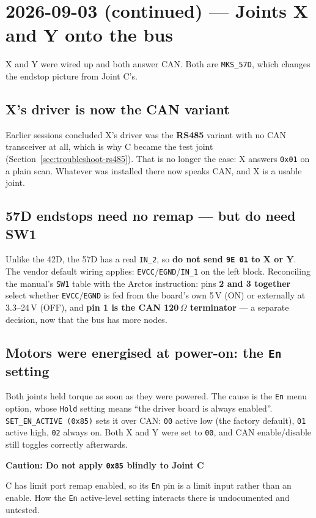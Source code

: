 \documentclass[11pt,letterpaper]{article}
\newenvironment{caution}[1]{%
    \par\addvspace{8pt}%
    \noindent{\color{cautionred}\rule{\linewidth}{0.8pt}}\par\vspace{2pt}
    \noindent\textbf{\color{cautionred}Caution: #1}\par\vspace{2pt}
}{%
    \par\vspace{2pt}\noindent{\color{cautionred}\rule{\linewidth}{0.4pt}}%
    \par\addvspace{8pt}%
}
\begin{document}
\section{2026-09-03 (continued) --- Joints X and Y onto the bus}
\label{sec:session-2026-09-03-xy}
X and Y were wired up and both answer CAN. Both are \texttt{MKS\_57D}, which
changes the endstop picture from Joint C's.

\subsection{X's driver is now the CAN variant}
Earlier sessions concluded X's driver was the \textbf{RS485} variant with no CAN
transceiver at all, which is why C became the test joint
(Section~\ref{sec:troubleshoot-rs485}). That is no longer the case: X answers
\texttt{0x01} on a plain scan. Whatever was installed there now speaks CAN, and X
is a usable joint.

\subsection{57D endstops need no remap --- but do need SW1}
Unlike the 42D, the 57D has a real \texttt{IN\_2}, so \textbf{do not send
\texttt{9E 01} to X or Y}. The vendor default wiring applies:
\texttt{EVCC}/\texttt{EGND}/\texttt{IN\_1} on the left block. Reconciling the
manual's \texttt{SW1} table with the Arctos instruction: pins \textbf{2 and 3
together} select whether \texttt{EVCC}/\texttt{EGND} is fed from the board's own
5\,V (ON) or externally at 3.3--24\,V (OFF), and \textbf{pin 1 is the CAN 120\,\(\Omega\)
terminator} --- a separate decision, now that the bus has more nodes.

\subsection{Motors were energised at power-on: the \texttt{En} setting}
Both joints held torque as soon as they were powered. The cause is the \texttt{En}
menu option, whose \texttt{Hold} setting means ``the driver board is always
enabled''. \texttt{SET\_EN\_ACTIVE (0x85)} sets it over CAN:
\texttt{00} active low (the factory default), \texttt{01} active high, \texttt{02}
always on. Both X and Y were set to \texttt{00}, and CAN enable/disable still
toggles correctly afterwards.

\begin{caution}{Do not apply \texttt{0x85} blindly to Joint C}
C has limit port remap enabled, so its \texttt{En} pin is a limit input rather
than an enable. How the \texttt{En} active-level setting interacts there is
undocumented and untested.
\end{caution}
\end{document}
